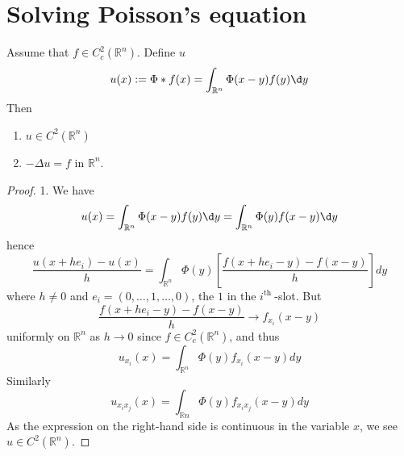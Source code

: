 \section{Solving Poisson's equation}
\begin{theorem}
    Assume that $f \in C_c^2\left(\mathbb{R}^n\right)$.
    Define $u$
    \begin{equation*}
        u(x)
        :=
        \Phi*f(x)
        =\int_{\mathbb{R}^n} \Phi(x-y)f(y) \d y
    \end{equation*}
    Then
    \begin{enumerate}
        \item
              $u \in C^2\left(\mathbb{R}^n\right)$


        \item
              $-\Delta u=f$ in $\mathbb{R}^n$.
    \end{enumerate}

    \begin{proof}
        1. We have
        \begin{equation*}
            u(x)
            =
            \int_{\mathbb{R}^n} \Phi(x-y) f(y) \d y
            =
            \int_{\mathbb{R}^n} \Phi(y) f(x-y) \d y
        \end{equation*}
        hence
        \begin{equation*}
            \frac{u\left(x+h e_i\right)-u(x)}{h}=\int_{\mathbb{R}^n} \Phi(y)\left[\frac{f\left(x+h e_i-y\right)-f(x-y)}{h}\right] d y
        \end{equation*}
        where $h \neq 0$ and $e_i=(0, \ldots, 1, \ldots, 0)$, the $1$ in the $i^{\text {th }}$-slot. But
        \begin{equation*}
            \frac{f\left(x+h e_i-y\right)-f(x-y)}{h} \rightarrow f_{x_i}(x-y)
        \end{equation*}
        uniformly on $\mathbb{R}^n$ as $h \rightarrow 0$ since  $f\in C_c^2\left(\mathbb{R}^n\right)$, and thus
        \begin{equation*}
            u_{x_i}(x)=\int_{\mathbb{R}^n} \Phi(y) f_{x_i}(x-y) d y
        \end{equation*}
        Similarly
        \begin{equation*}
            u_{x_i x_j}(x)=\int_{\mathbb{R} n} \Phi(y) f_{x_i x_j}(x-y) d y
        \end{equation*}
        As the expression on the right-hand side is continuous in the variable $x$, we see $u \in C^2\left(\mathbb{R}^n\right)$.


\end{proof}
\end{theorem}
